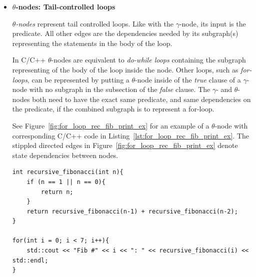\begin{itemize}
\item \textbf{$\theta$-nodes: Tail-controlled loops}

\textit{$\theta$-nodes} represent tail controlled loops. Like with the
$\gamma$-node, its input is the predicate. All other edges are the dependencies
needed by its subgraph(s) representing the statements in the body of the loop.

In C/C++ $\theta$-nodes are equivalent to \textit{do-while loops} containing the
subgraph representing of the body of the loop inside the node. Other loops, such
as \textit{for-loops}, can be represented by putting a $\theta$-node inside of
the \textit{true} clause of a $\gamma$-node with no subgraph in the subsection
of the \textit{false} clause. The $\gamma$- and $\theta$-nodes both need to have
the exact same predicate, and same dependencies on the predicate, if the
combined subgraph is to represent a for-loop.

See Figure~\ref{fig:for_loop_rec_fib_print_ex} for an example of a $\theta$-node
with corresponding C/C++ code in Listing~\ref{lst:for_loop_rec_fib_print_ex}.
The stippled directed edges in Figure~\ref{fig:for_loop_rec_fib_print_ex} denote
state dependencies between nodes.

\begin{lstlisting}[label={lst:for_loop_rec_fib_print_ex}, style=customcpp,
caption={C/C++ code corresponding to the RVSDG subgraph in
Figure~\ref{fig:for_loop_rec_fib_print_ex}.}]
int recursive_fibonacci(int n){
	if (n == 1 || n == 0){
		return n;
	}
	return recursive_fibonacci(n-1) + recursive_fibonacci(n-2);
}

for(int i = 0; i < 7; i++){
	std::cout << "Fib #" << i << ": " << recursive_fibonacci(i) << std::endl;
}
\end{lstlisting}
\vspace{-4\parskip} %
\newpage


\end{itemize}
